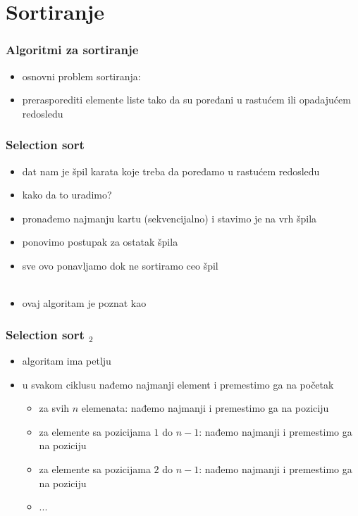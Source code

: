 \documentclass[utf8,compress]{beamer}
\begin{document}
\section{Sortiranje}

\begin{frame}[fragile]
  \frametitle{Algoritmi za sortiranje}
  \begin{itemize}
    \item osnovni problem sortiranja: 
    \item prerasporediti elemente liste tako da su poređani u rastućem ili opadajućem redosledu
  \end{itemize}
\end{frame}

\begin{frame}[fragile]
  \frametitle{Selection sort}
  \begin{itemize}
    \item dat nam je špil karata koje treba da poređamo u rastućem redosledu
    \item kako da to uradimo?
    \item pronađemo najmanju kartu (sekvencijalno) i stavimo je na vrh špila
    \item ponovimo postupak za ostatak špila
    \item sve ovo ponavljamo dok ne sortiramo ceo špil \\ \ \\
    \item ovaj algoritam je poznat kao 
  \end{itemize}
\end{frame}

\begin{frame}[fragile]
  \frametitle{Selection sort $_2$}
  \begin{itemize}
    \item algoritam ima petlju
    \item u svakom ciklusu nađemo najmanji element i premestimo ga na početak
  \begin{itemize}
    \item za svih $n$ elemenata: nađemo najmanji i premestimo ga na  poziciju
    \item za elemente sa pozicijama $1$ do $n-1$: nađemo najmanji i premestimo ga na  poziciju
    \item za elemente sa pozicijama $2$ do $n-1$: nađemo najmanji i premestimo ga na  poziciju
    \item ...
  \end{itemize}
  \end{itemize}
\end{frame}
\end{document}
